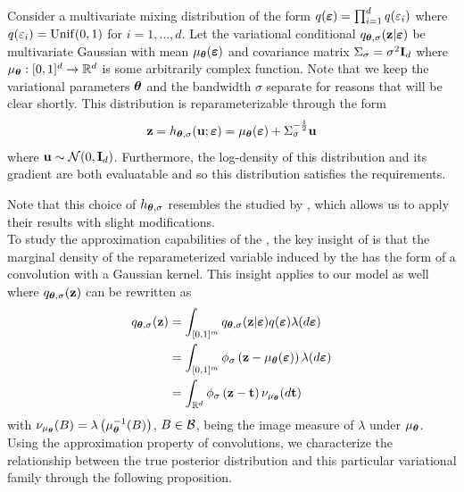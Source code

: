 \documentclass[10pt]{article}
\begin{document}
Consider a multivariate mixing distribution of the form $q(\bm{\varepsilon})=\prod_{i=1}^dq(\varepsilon_i)$ where $q(\varepsilon_i)=\mathrm{Unif}(0,1)$ for $i=1,\ldots,d$. Let the variational conditional $q_{{\bm{\theta}},\sigma}(\mathbf{z}|\bm{\varepsilon})$ be multivariate Gaussian with mean $\mu_{{\bm{\theta}}}(\bm{\varepsilon})$ and covariance matrix $\Sigma_{\sigma}=\sigma^2\mathbf{I}_d$ where $\mu_{\bm{\theta}}:[0,1]^d\rightarrow\mathbb{R}^d$ is some arbitrarily complex function. Note that we keep the variational parameters ${\bm{\theta}}$ and the bandwidth $\sigma$ separate for reasons that will be clear shortly. This distribution is reparameterizable through the form
\[
\mathbf{z} = h_{{\bm{\theta}},\sigma}(\mathbf{u};\bm{\varepsilon}) = \mu_{\bm{\theta}}(\bm{\varepsilon}) + \Sigma_{\sigma}^{-\frac{1}{2}}\mathbf{u}
\]
where $\mathbf{u}\sim \mathcal{N}(0,\mathbf{I}_d)$. Furthermore, the log-density of this distribution and its gradient are both evaluatable and so this distribution satisfies the \uivi requirements.

Note that this choice of $h_{{\bm{\theta}},\sigma}$ resembles the \nllvm studied by \citet{Plummer:2021}, which allows us to apply their results with slight modifications.
\\

To study the approximation capabilities of the \nllvm, the key insight of \citet{Plummer:2021} is that the marginal density of the reparameterized variable induced by the \nllvm has the form of a convolution with a Gaussian kernel. This insight applies to our \uivi model as well where $q_{{\bm{\theta}},\sigma}(\mathbf{z})$ can be rewritten as
\begin{align*}
q_{{\bm{\theta}},\sigma}(\mathbf{z}) &= \int_{[0,1]^m} q_{{\bm{\theta}},\sigma}(\mathbf{z}|\bm{\varepsilon})q(\bm{\varepsilon})\lambda(d\bm{\varepsilon}) \\
&= \int_{[0,1]^m} \phi_\sigma\left(\mathbf{z}-\mu_{\bm{\theta}}(\bm{\varepsilon})\right)\lambda(d\bm{\varepsilon}) \\
&= \int_{\mathbb{R}^d} \phi_\sigma\left(\mathbf{z}-\mathbf{t}\right)\nu_{\mu_{\bm{\theta}}}(d\mathbf{t})
\end{align*}
with $\nu_{\mu_{\bm{\theta}}}(B)=\lambda\left(\mu_{\bm{\theta}}^{-1}(B)\right)$, $B\in\mathcal{B}$, being the image measure of $\lambda$ under $\mu_{\bm{\theta}}$. Using the approximation property of convolutions, we characterize the relationship between the true posterior distribution and this particular variational family through the following proposition.
\end{document}
